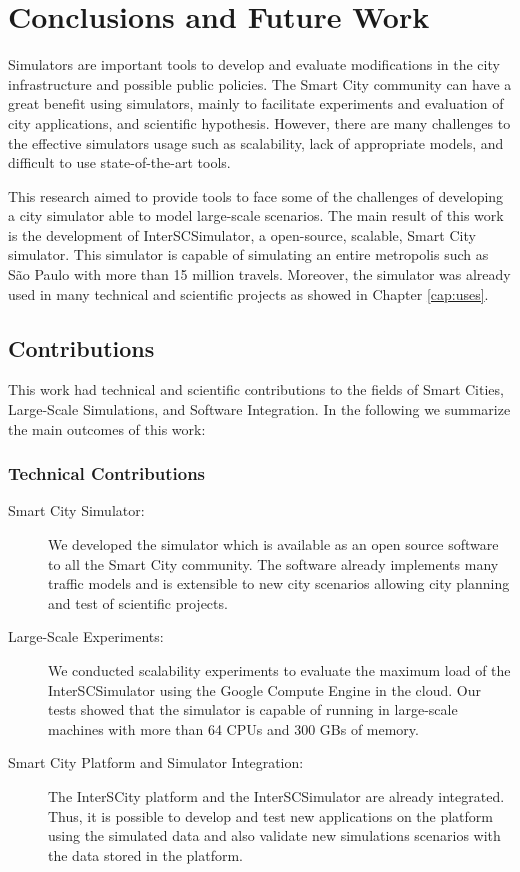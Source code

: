 \chapter{Conclusions and Future Work}
\label{cap:conclusoes}

Simulators are important tools to develop and evaluate modifications in the city infrastructure and possible public policies. The Smart City community can have a great benefit using simulators, mainly to facilitate experiments and evaluation of city applications, and scientific hypothesis. However, there are many challenges to the effective simulators usage such as scalability, lack of appropriate models, and difficult to use state-of-the-art tools.

This research aimed to provide tools to face some of the challenges of developing a city simulator able to model large-scale scenarios. The main result of this work is the development of InterSCSimulator, a open-source, scalable, Smart City simulator. This simulator is capable of simulating an entire metropolis such as S\~ao Paulo with more than 15 million travels. Moreover, the simulator was already used in many technical and scientific projects as showed in Chapter \ref{cap:uses}.

\section{Contributions}

This work had technical and scientific contributions to the fields of Smart Cities, Large-Scale Simulations, and Software Integration. In the following we summarize the main outcomes of this work:

\subsection{Technical Contributions}

\begin{description}

\item[Smart City Simulator:] We developed the simulator which is available as an open source software to all the Smart City community. The software already implements many traffic models and is extensible to new city scenarios allowing city planning and test of scientific projects.

\item[Large-Scale Experiments:] We conducted scalability experiments to evaluate the maximum load of the InterSCSimulator using the Google Compute Engine in the cloud. Our tests showed that the simulator is capable of running in large-scale machines with more than 64 CPUs and 300 GBs of memory.

\item[Smart City Platform and Simulator Integration:] The InterSCity platform and the InterSCSimulator are already integrated. Thus, it is possible to develop and test new applications on the platform using the simulated data and also validate new simulations scenarios with the data stored in the platform.

\end{description}

